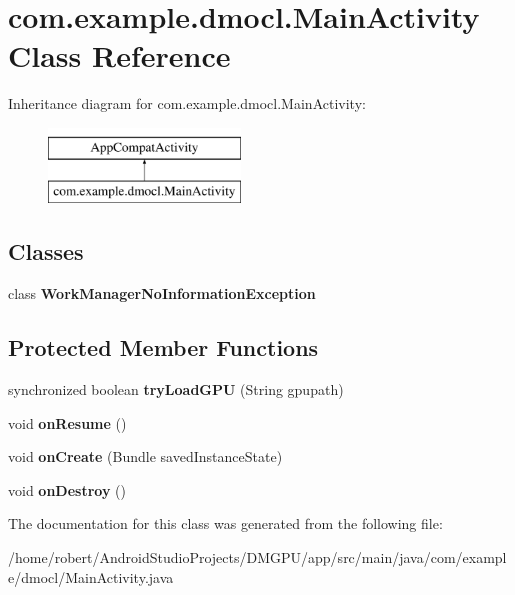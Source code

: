 \hypertarget{classcom_1_1example_1_1dmocl_1_1MainActivity}{}\section{com.\+example.\+dmocl.\+Main\+Activity Class Reference}
\label{classcom_1_1example_1_1dmocl_1_1MainActivity}
Inheritance diagram for com.\+example.\+dmocl.\+Main\+Activity\+:\begin{figure}[H]
\begin{center}
\leavevmode
\includegraphics[height=2.000000cm]{classcom_1_1example_1_1dmocl_1_1MainActivity}
\end{center}
\end{figure}
\subsection*{Classes}
\begin{DoxyCompactItemize}
\item 
class {\bfseries Work\+Manager\+No\+Information\+Exception}
\end{DoxyCompactItemize}
\subsection*{Protected Member Functions}
\begin{DoxyCompactItemize}
\item 
\mbox{\label{classcom_1_1example_1_1dmocl_1_1MainActivity_a26973c08d4b74dcce01e294077211c2f}} 
synchronized boolean {\bfseries try\+Load\+G\+PU} (String gpupath)
\item 
\mbox{\label{classcom_1_1example_1_1dmocl_1_1MainActivity_a59609da2fb62ee158da1d4efc6d26f63}} 
void {\bfseries on\+Resume} ()
\item 
\mbox{\label{classcom_1_1example_1_1dmocl_1_1MainActivity_a10f895ac3f6343c7b6c3b946ceadbf32}} 
void {\bfseries on\+Create} (Bundle saved\+Instance\+State)
\item 
\mbox{\label{classcom_1_1example_1_1dmocl_1_1MainActivity_a0ba841e058a14398a5a6766e0618bd59}} 
void {\bfseries on\+Destroy} ()
\end{DoxyCompactItemize}


The documentation for this class was generated from the following file\+:\begin{DoxyCompactItemize}
\item 
/home/robert/\+Android\+Studio\+Projects/\+D\+M\+G\+P\+U/app/src/main/java/com/example/dmocl/Main\+Activity.\+java\end{DoxyCompactItemize}
